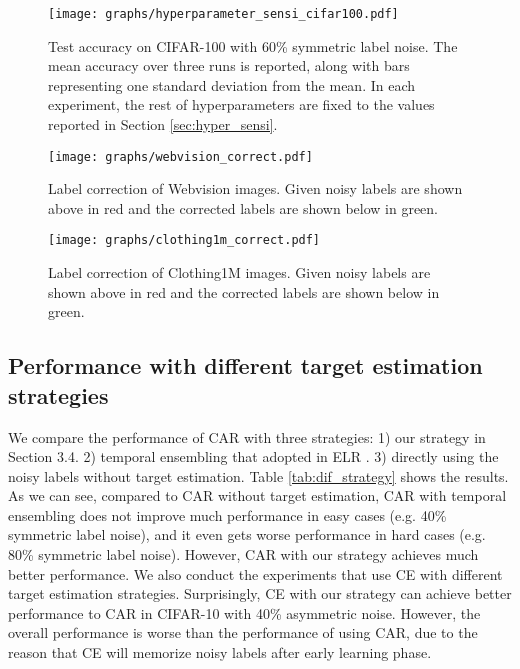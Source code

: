 \documentclass{article}
\begin{document}
\begin{figure}[t]
	\begin{center}
		\texttt{[image: graphs/hyperparameter\_sensi\_cifar100.pdf]}
	\end{center}
	\caption{Test accuracy on CIFAR-100 with 60\% symmetric label noise. The mean accuracy over three runs is reported, along with bars representing one standard deviation from the mean. In each experiment, the rest of hyperparameters are fixed to the values reported in Section \ref{sec:hyper_sensi}.}
	\label{fig:hyper_sensi_cifar100}
\end{figure}



\begin{figure}[t]
	\begin{center}
		\texttt{[image: graphs/webvision\_correct.pdf]}
	\end{center}
	\caption{Label correction of Webvision images. Given noisy labels are shown above in red and the corrected labels are shown below in green.}
	\label{fig:webvision_correct}
\end{figure}

\begin{figure}[htb!]
	\begin{center}
		\texttt{[image: graphs/clothing1m\_correct.pdf]}
	\end{center}
	\caption{Label correction of Clothing1M images. Given noisy labels are shown above in red and the corrected labels are shown below in green.}
	\label{fig:clothing1M_correct}
\end{figure}



\subsection{Performance with different target estimation strategies}
\label{apd:dif_stra}
We compare the performance of CAR with three strategies: 1) our strategy in Section 3.4. 2) temporal ensembling \cite{laine2016temporal} that adopted in ELR \cite{liu2020early}. 3) directly using the noisy labels  without target estimation. Table \ref{tab:dif_strategy} shows the results. As we can see, compared to CAR without target estimation, CAR with temporal ensembling does not improve much performance in easy cases (e.g. 40\% symmetric label noise), and it even gets worse performance in hard cases (e.g. 80\% symmetric label noise). However, CAR with our strategy achieves much better performance. We also conduct the experiments that use CE with different target estimation strategies. Surprisingly, CE with our strategy can achieve better performance to CAR in CIFAR-10 with 40\% asymmetric noise. However, the overall performance is worse than the performance of using CAR, due to the reason that CE will memorize noisy labels after early learning phase.
\end{document}
